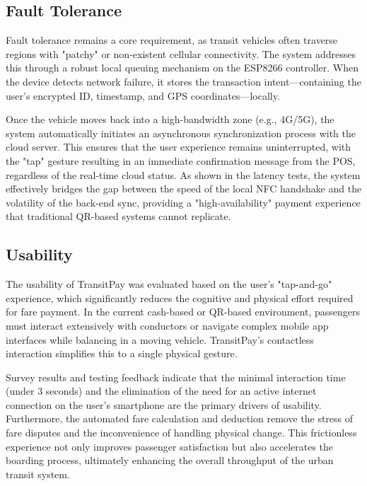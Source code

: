\documentclass[sigconf, nonacm]{acmart}
\begin{document}
\subsection{Fault Tolerance}

Fault tolerance remains a core requirement, as transit vehicles often traverse regions with "patchy" or non-existent cellular connectivity. The system addresses this through a robust local queuing mechanism on the ESP8266 controller. When the device detects network failure, it stores the transaction intent—containing the user's encrypted ID, timestamp, and GPS coordinates—locally. 

Once the vehicle moves back into a high-bandwidth zone (e.g., 4G/5G), the system automatically initiates an asynchronous synchronization process with the cloud server. This ensures that the user experience remains uninterrupted, with the "tap" gesture resulting in an immediate confirmation message from the POS, regardless of the real-time cloud status. As shown in the latency tests, the system effectively bridges the gap between the speed of the local NFC handshake and the volatility of the back-end sync, providing a "high-availability" payment experience that traditional QR-based systems cannot replicate.

\subsection{Usability}

The usability of TransitPay was evaluated based on the user's "tap-and-go" experience, which significantly reduces the cognitive and physical effort required for fare payment. In the current cash-based or QR-based environment, passengers must interact extensively with conductors or navigate complex mobile app interfaces while balancing in a moving vehicle. TransitPay's contactless interaction simplifies this to a single physical gesture. 

Survey results and testing feedback indicate that the minimal interaction time (under 3 seconds) and the elimination of the need for an active internet connection on the user's smartphone are the primary drivers of usability. Furthermore, the automated fare calculation and deduction remove the stress of fare disputes and the inconvenience of handling physical change. This frictionless experience not only improves passenger satisfaction but also accelerates the boarding process, ultimately enhancing the overall throughput of the urban transit system.
\end{document}
